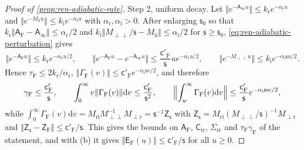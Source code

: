 \begin{proof}[Proof of \cref{prop:ren-adiabatic-rate}]
Step 2, uniform decay. Let $\Vert e^{-\mathsf A_\infty u}\Vert\le k_{\mathrm r}e^{-\alpha_{\mathrm r}u}$ and $\Vert e^{-M_{\mathrm{ii}}u}\Vert\le k_{\mathrm i}e^{-\alpha_{\mathrm i}u}$ with $\alpha_{\mathrm r},\alpha_{\mathrm i}>0$. After enlarging $\mathsf s_0$ so that $k_{\mathrm r}\Vert\mathsf A_{\mathrm F}-\mathsf A_\infty\Vert\le\alpha_{\mathrm r}/2$ and $k_{\mathrm i}\Vert M_{\perp\perp}/\mathsf s-M_{\mathrm{ii}}\Vert\le\alpha_{\mathrm i}/2$ for $\mathsf s\ge\mathsf s_0$, \eqref{eq:ren-adiabatic-perturbation} gives
\[
\bigl\Vert e^{-\mathsf A_{\mathrm F}u}\bigr\Vert\le k_{\mathrm r}e^{-\alpha_{\mathrm r}u/2},\qquad\bigl\Vert e^{-\mathsf A_{\mathrm F}u}-e^{-\mathsf A_\infty u}\bigr\Vert\le\frac{\mathsf c'_{\mathrm F}}{\mathsf s}ue^{-\alpha_{\mathrm r}u/2},\qquad\bigl\Vert e^{-M_{\perp\perp}u}\bigr\Vert\le k_{\mathrm i}e^{-\alpha_{\mathrm i}\mathsf su/2}.
\]
Hence $\tau_{\mathrm F}\le2k_{\mathrm r}/\alpha_{\mathrm r}$, $\Vert\Gamma_{\mathrm F}(v)\Vert\le\mathsf c'_{\mathrm F}e^{-\alpha_{\mathrm i}\mathsf sv/2}$, and therefore
\begin{equation}\label{eq:ren-adiabatic-kernel-moments}
\gamma_{\mathrm F}\le\frac{\mathsf c'_{\mathrm F}}{\mathsf s},\qquad\int_0^\infty v\Vert\Gamma_{\mathrm F}(v)\Vert\mathrm dv\le\frac{\mathsf c'_{\mathrm F}}{\mathsf s^2},\qquad\Bigl\Vert\int_w^\infty\Gamma_{\mathrm F}(v)\mathrm dv\Bigr\Vert\le\frac{\mathsf c'_{\mathrm F}}{\mathsf s}e^{-\alpha_{\mathrm i}\mathsf sw/2},
\end{equation}
while $\int_0^\infty\Gamma_{\mathrm F}(v)\mathrm dv=M_{\mathrm{ri}}M_{\perp\perp}^{-1}M_{\perp\mathrm r}=\mathsf s^{-1}\mathsf Z_{\mathsf s}$ with $\mathsf Z_{\mathsf s}=M_{\mathrm{ri}}(M_{\perp\perp}/\mathsf s)^{-1}M_{\perp\mathrm r}$ and $\Vert\mathsf Z_{\mathsf s}-\mathsf Z_{\mathrm F}\Vert\le\mathsf c'_{\mathrm F}/\mathsf s$. This gives the bounds on $\mathsf A_{\mathrm F}$, $\mathsf C_{\mathrm{ir}}$, $\Sigma_{\mathrm{rr}}$ and $\tau_{\mathrm F}\gamma_{\mathrm F}$ of the statement, and with (b) it gives $\Vert\mathsf E_{\mathrm F}(u)\Vert\le\mathsf c'_{\mathrm F}/\mathsf s$ for all $u\ge0$.


\end{proof}
